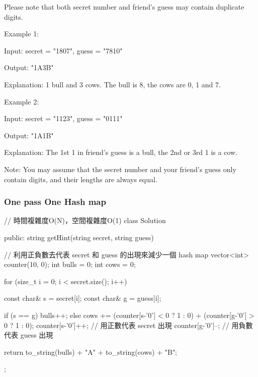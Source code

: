 Please note that both secret number and friend's guess may contain duplicate digits.

Example 1:
\begin{Code}
Input: secret = "1807", guess = "7810"

Output: "1A3B"

Explanation: 1 bull and 3 cows. The bull is 8, the cows are 0, 1 and 7.
\end{Code}

Example 2:
\begin{Code}
Input: secret = "1123", guess = "0111"

Output: "1A1B"

Explanation: The 1st 1 in friend's guess is a bull, the 2nd or 3rd 1 is a cow.
\end{Code}


Note:
You may assume that the secret number and your friend's guess only contain digits, and their lengths are always equal.

\subsubsection{One pass One Hash map}
\begin{Code}
// 時間複雜度O(N)，空間複雜度O(1)
class Solution {
public:
    string getHint(string secret, string guess) {
        // 利用正負數去代表 secret 和 guess 的出現來減少一個 hash map
        vector<int> counter(10, 0);
        int bulls = 0;
        int cows = 0;

        for (size_t i = 0; i < secret.size(); i++)
        {
            const char& s = secret[i];
            const char& g = guess[i];

            if (s == g)
                bulls++;
            else
            {
                cows += (counter[s-'0'] < 0 ? 1 : 0) + (counter[g-'0'] > 0 ? 1 : 0);
                counter[s-'0']++; // 用正數代表 secret 出現
                counter[g-'0']--; // 用負數代表 guess 出現
            }
        }

        return to_string(bulls) + "A" + to_string(cows) + "B";
    }
};
\end{Code}
